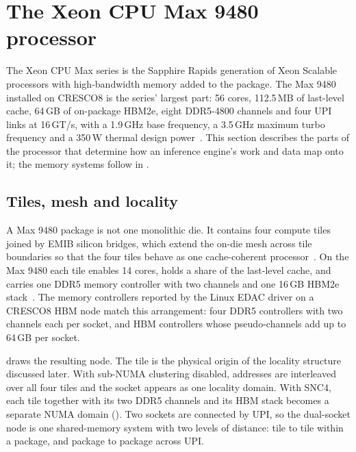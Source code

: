 
\section{The Xeon CPU Max 9480 processor}
\label{sec:xeon-max-processor}

The Xeon CPU Max series is the Sapphire Rapids generation of Xeon
Scalable processors with high-bandwidth memory added to the package.
The Max 9480 installed on CRESCO8 is the series' largest part: 56 cores,
112.5\,MB of last-level cache, 64\,GB of on-package HBM2e, eight DDR5-4800
channels and four UPI links at 16\,GT/s, with a 1.9\,GHz base frequency,
a 3.5\,GHz maximum turbo frequency and a 350\,W thermal design
power~\cite{intel9480,intelmaxoverview}.  This section describes the
parts of the processor that determine how an inference engine's work
and data map onto it; the memory systems follow in
.

\subsection{Tiles, mesh and locality}
\label{sec:xeon-max-tiles}

A Max 9480 package is not one monolithic die.  It contains four compute
tiles joined by EMIB silicon bridges, which extend the on-die mesh across
tile boundaries so that the four tiles behave as one cache-coherent
processor~\cite{nassif2022sapphire}.  On the Max 9480 each tile enables 14
cores, holds a share of the last-level cache, and carries one DDR5 memory
controller with two channels and one 16\,GB HBM2e
stack~\cite{intelmaxoverview,lp1738}.  The memory controllers reported by
the Linux EDAC driver on a CRESCO8 HBM node match this arrangement: four
DDR5 controllers with two channels each per socket, and HBM controllers
whose pseudo-channels add up to 64\,GB per socket.

 draws the resulting node.  The tile is the
physical origin of the locality structure discussed later.  With
sub-NUMA clustering disabled, addresses are interleaved over all four
tiles and the socket appears as one locality domain.  With SNC4, each
tile together with its two DDR5 channels and its HBM stack becomes a
separate NUMA domain ().  Two sockets are
connected by UPI, so the dual-socket node is one shared-memory system
with two levels of distance: tile to tile within a package, and package
to package across UPI.


